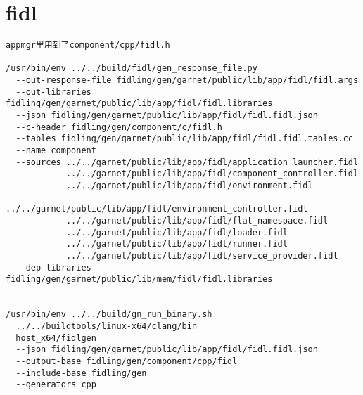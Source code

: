 \section{fidl}

\begin{verbatim}
appmgr里用到了component/cpp/fidl.h

/usr/bin/env ../../build/fidl/gen_response_file.py 
  --out-response-file fidling/gen/garnet/public/lib/app/fidl/fidl.args 
  --out-libraries fidling/gen/garnet/public/lib/app/fidl/fidl.libraries 
  --json fidling/gen/garnet/public/lib/app/fidl/fidl.fidl.json 
  --c-header fidling/gen/component/c/fidl.h 
  --tables fidling/gen/garnet/public/lib/app/fidl/fidl.fidl.tables.cc 
  --name component 
  --sources ../../garnet/public/lib/app/fidl/application_launcher.fidl 
            ../../garnet/public/lib/app/fidl/component_controller.fidl 
            ../../garnet/public/lib/app/fidl/environment.fidl 
            ../../garnet/public/lib/app/fidl/environment_controller.fidl 
            ../../garnet/public/lib/app/fidl/flat_namespace.fidl 
            ../../garnet/public/lib/app/fidl/loader.fidl 
            ../../garnet/public/lib/app/fidl/runner.fidl 
            ../../garnet/public/lib/app/fidl/service_provider.fidl 
  --dep-libraries fidling/gen/garnet/public/lib/mem/fidl/fidl.libraries


/usr/bin/env ../../build/gn_run_binary.sh 
  ../../buildtools/linux-x64/clang/bin 
  host_x64/fidlgen 
  --json fidling/gen/garnet/public/lib/app/fidl/fidl.fidl.json 
  --output-base fidling/gen/component/cpp/fidl 
  --include-base fidling/gen 
  --generators cpp


\end{verbatim}